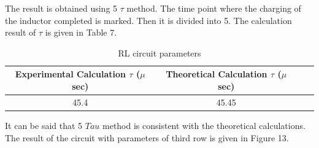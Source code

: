 \documentclass[letterpaper,12pt]{article}
\begin{document}
The result is obtained using 5 \(\tau\) method. The time point where the charging of the inductor completed is marked. Then it is divided into 5. The calculation result of \(\tau\) is given in Table 7.
\begin{table}[H]
	\begin{center}
	\caption{RL circuit parameters}
	\vspace{2mm}
		\begin{tabular}{||c | c | c | c||} 
		 \hline
		 Experimental Calculation \(\tau\) (\(\mu\) sec) & Theoretical Calculation \(\tau\) (\(\mu\) sec) \\ [0.5ex] 
		 \hline\hline
		 45.4 & 45.45 \\ 
		 \hline
	\end{tabular}
	\end{center}
	\end{table}
It can be said that 5 \(Tau\) method is consistent with the theoretical calculations. \\

The result of the circuit with parameters of third row is given in Figure 13.
\end{document}
